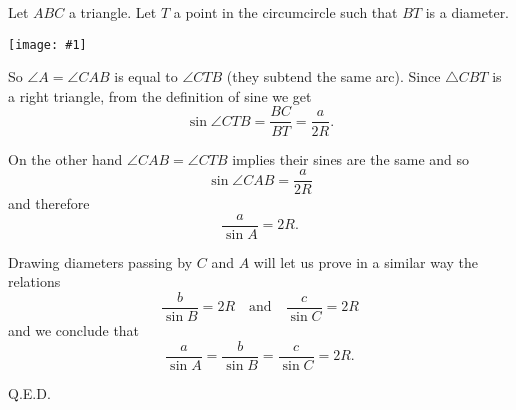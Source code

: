\documentclass{article}
\newcommand{\figura}[1]{\begin{center}\texttt{[image: \#1]}\end{center}}
\begin{document}
Let $ABC$ a triangle. Let $T$ a point in the circumcircle such that $BT$ is a diameter. 
\figura{sineslawproof}

So $\angle A=\angle CAB$ is equal to $\angle CTB$ (they subtend the same arc). Since $\triangle CBT$ is a right triangle, from the definition of sine we get
$$\sin \angle CTB =\frac{BC}{BT}=\frac{a}{2R}.$$

On the other hand $\angle CAB=\angle CTB$ implies their sines are the same and so
$$\sin \angle CAB=\frac{a}{2R}$$
and therefore
$$\frac{a}{\sin A}=2R.$$

Drawing diameters passing by $C$ and $A$ will let us prove in a similar way the relations
$$\frac{b}{\sin B}=2R\quad\mbox{and}\quad\frac{c}{\sin C}=2R$$
and we conclude that $$\frac{a}{\sin A}=\frac{b}{\sin B}=\frac{c}{\sin C}=2R.$$

Q.E.D.
\end{document}
